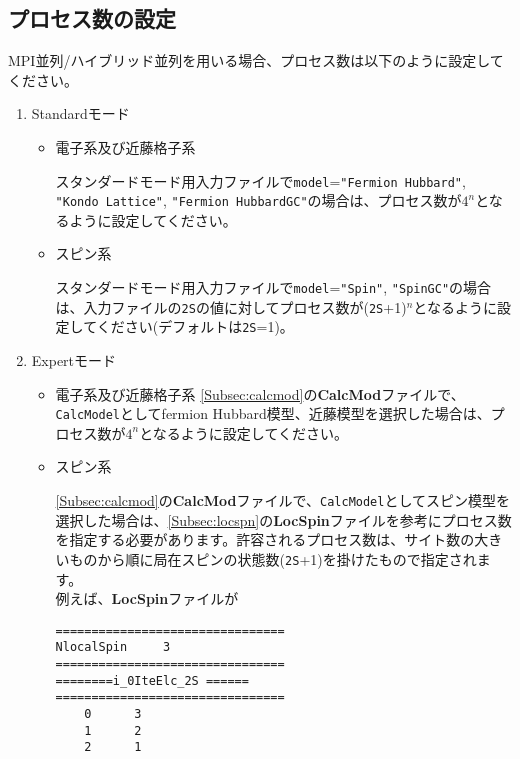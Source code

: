 \newpage
\subsection{プロセス数の設定}
\label{SetProcess}
{MPI並列/ハイブリッド並列を用いる場合、プロセス数は以下のように設定してください。}
\begin{enumerate}
\item{Standardモード}

\begin{itemize}
\item{電子系及び近藤格子系 }

スタンダードモード用入力ファイルで\verb|model|=\verb|"Fermion Hubbard"|, \\
\verb|"Kondo Lattice"|, \verb|"Fermion HubbardGC"|の場合は、プロセス数が$4^n$となるように設定してください。

\item{スピン系}

スタンダードモード用入力ファイルで\verb|model|=\verb|"Spin"|, \verb|"SpinGC"|の場合は、入力ファイルの\verb|2S|の値に対してプロセス数が(\verb|2S|+1)${}^n$となるように設定してください(デフォルトは\verb|2S|=1)。
\end{itemize}
\item{Expertモード}

\begin{itemize}
\item{電子系及び近藤格子系 }
\ref{Subsec:calcmod}の{\bf CalcMod}ファイルで、\verb|CalcModel|としてfermion Hubbard模型、近藤模型を選択した場合は、プロセス数が$4^n$となるように設定してください。

\item{スピン系 }

\ref{Subsec:calcmod}の{\bf CalcMod}ファイルで、\verb|CalcModel|としてスピン模型を選択した場合は、\ref{Subsec:locspn}の{\bf LocSpin}ファイルを参考にプロセス数を指定する必要があります。許容されるプロセス数は、サイト数の大きいものから順に局在スピンの状態数(\verb|2S|+1)を掛けたもので指定されます。\\
例えば、{\bf LocSpin}ファイルが

\begin{minipage}{10cm}
\begin{screen}
\begin{verbatim}
================================ 
NlocalSpin     3
================================ 
========i_0IteElc_2S ====== 
================================ 
    0      3
    1      2
    2      1
\end{verbatim}
\end{screen}
\end{minipage}


\end{itemize}
\end{enumerate}
